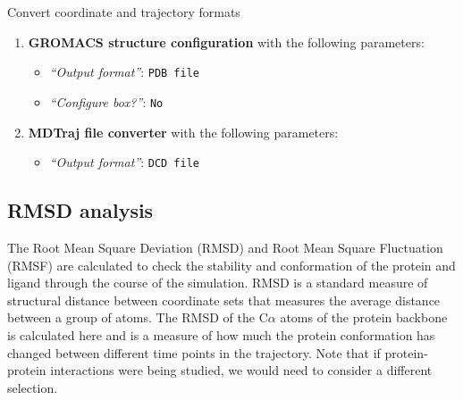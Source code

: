 \documentclass[twocolumn]{bmcart}%
\providecommand{\tightlist}{%
  \setlength{\itemsep}{0pt}\setlength{\parskip}{0pt}}
\begin{document}
\begin{handson_box_colour}{Convert coordinate and trajectory formats}
\begin{enumerate}
\def\labelenumi{\arabic{enumi}.}
 \item
  \textbf{GROMACS structure configuration} with the following
  parameters:

  \begin{itemize}
  \tightlist
  \item
    \emph{``Output format''}: \texttt{PDB\ file}
  \item
    \emph{``Configure box?''}: \texttt{No}
  \end{itemize}

 \item
  \textbf{MDTraj file converter} with the following parameters:

  \begin{itemize}
  \tightlist
  \item
    \emph{``Output format''}: \texttt{DCD\ file}
  \end{itemize}
\end{enumerate}
\end{handson_box_colour}




\hypertarget{rmsd-analysis}{%
\subsection*{RMSD analysis}\label{rmsd-analysis}}


The Root Mean Square Deviation (RMSD) and Root Mean Square Fluctuation (RMSF) are calculated to check the stability and conformation of the protein and ligand through the course of the simulation. 
RMSD is a standard measure of structural distance between coordinate
sets that measures the average distance between a group of atoms. The
RMSD of the C$\alpha$ atoms of the protein backbone is calculated here and
is a measure of how much the protein conformation has changed between different time points in the trajectory. Note that if protein-protein interactions were being studied, we would need to consider a different selection. 
\end{document}
